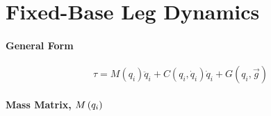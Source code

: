 \chapter{Fixed-Base Leg Dynamics}
\label{appendix::b}
	\vspace{-5mm}


	\subsubsection{General Form}	
	\begin{equation*}
		\tau = M(q_{i})\ddot{q}_{i} + C(q_{i},\dot{q}_{i})\dot{q}_{i} + G(q_{i},\vec{g})
	\end{equation*}


	\subsubsection{Mass Matrix, $M\left(q_{i}\right)$}	
